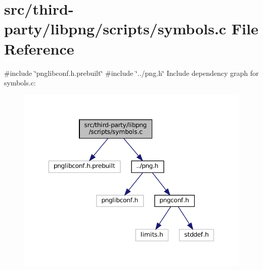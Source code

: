 \hypertarget{third-party_2libpng_2scripts_2symbols_8c}{}\section{src/third-\/party/libpng/scripts/symbols.c File Reference}
\label{third-party_2libpng_2scripts_2symbols_8c}
{\ttfamily \#include \char`\"{}pnglibconf.\+h.\+prebuilt\char`\"{}}\newline
{\ttfamily \#include \char`\"{}../png.\+h\char`\"{}}\newline
Include dependency graph for symbols.\+c\+:
\nopagebreak
\begin{figure}[H]
\begin{center}
\leavevmode
\includegraphics[width=350pt]{third-party_2libpng_2scripts_2symbols_8c__incl}
\end{center}
\end{figure}

